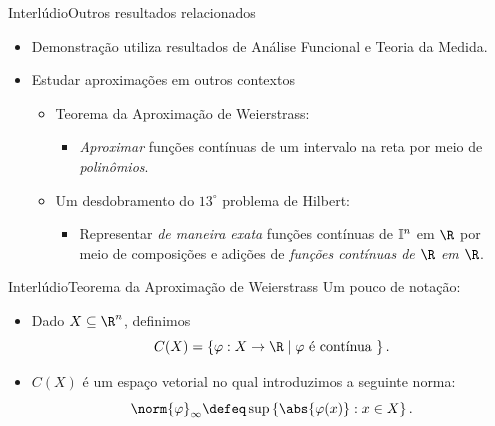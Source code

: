 \documentclass[13pt]{beamer}
\begin{document}
\begin{frame}{Interlúdio}{Outros resultados relacionados}
    \begin{itemize}
        \item<1-> Demonstração utiliza resultados de Análise Funcional e Teoria da Medida.
        \item<2-> Estudar aproximações em outros contextos
            \begin{itemize}
                \item<3-> Teorema da Aproximação de Weierstrass:
                    \begin{itemize}
                        \item<4-> \emph{Aproximar} funções contínuas de um intervalo na reta por meio de \emph{polinômios}.
                    \end{itemize}
                \item<5-> Um desdobramento do \( 13^{ \circ } \) problema de Hilbert:
                    \begin{itemize}
                        \item<6-> Representar \emph{de maneira exata} funções contínuas de \( \mathbb{I}^{ n } \) em \( \R \) por meio de composições e adições de \emph{funções contínuas de \( \R \) em \( \R \)}.
                    \end{itemize}
            \end{itemize}
    \end{itemize}
\end{frame}

\begin{frame}{Interlúdio}{Teorema da Aproximação de Weierstrass}
    Um pouco de notação:
    \begin{itemize}
        \item Dado \( X \subseteq \R^{ n } \), definimos
            \begin{equation*}
                C ( X ) = \left\{ \varphi : X \to \R \mid \varphi \text{ é contínua } \right\}
            .\end{equation*}
        \item \( C ( X ) \) é um espaço vetorial no qual introduzimos a seguinte norma:
            \begin{equation*}
                \norm{ \varphi }_{ \infty } \defeq \sup \left\{ \abs{ \varphi ( x ) } : x \in X \right\}
            .\end{equation*}
    \end{itemize}
\end{frame}
\end{document}
